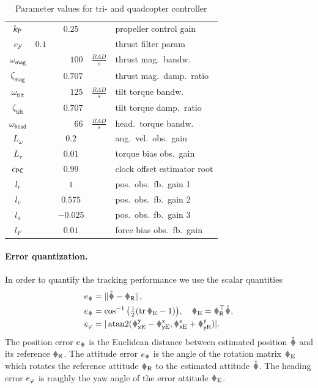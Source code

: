 \begin{table}
\begin{tabular}{crlrll}
  $k_{\mathsf{P}}$  & \multicolumn{4}{c}{$0.25$} & propeller control gain \\
  $c_F$ & $0.1$& & & & thrust filter param \\
  $\omega_{\mathsf{mag}}$ & & & $100$&$\tfrac{\unit{RAD}}{\unit{s}}$ & thrust mag.\ bandw.\ \\
  $\zeta_{\mathsf{mag}}$ & & & $0.707$& & thrust mag.\ damp.\ ratio \\
  $\omega_{\mathsf{tilt}}$ & & & $125$&$\tfrac{\unit{RAD}}{\unit{s}}$ & tilt torque bandw.\ \\
  $\zeta_{\mathsf{tilt}}$ & & & $0.707$& & tilt torque damp.\ ratio \\
  $\omega_{\mathsf{head}}$ & & & $66$&$\tfrac{\unit{RAD}}{\unit{s}}$ & head.\ torque bandw.\ \\
  \midrule
  $L_\omega$  & \multicolumn{4}{c}{$0.2$} & ang.\ vel.\ obs.\ gain \\
  $L_\tau$  & \multicolumn{4}{c}{$0.01$} & torque bias obs.\ gain \\
  $c_{\mathsf{PC}}$  & \multicolumn{4}{c}{$0.99$} & clock offset estimator root \\
  $l_r$  & \multicolumn{4}{c}{$1$} & pos.\ obs.\ fb.\ gain 1 \\
  $l_v$  & \multicolumn{4}{c}{$0.575$} & pos.\ obs.\ fb.\ gain 2 \\
  $l_a$  & \multicolumn{4}{c}{$-0.025$} & pos.\ obs.\ fb.\ gain 3 \\
  $l_F$  & \multicolumn{4}{c}{$0.01$} & force bias obs.\ fb.\ gain \\
  \bottomrule
 \end{tabular}
 \caption{Parameter values for tri- and quadcopter controller}
 \label{tab:ParamTriQuadCtrl}
\end{table}


\paragraph{Error quantization.}
In order to quantify the tracking performance we use the scalar quantities 
\begin{subequations}
\begin{align}
 e_{\r} &= \norm{\rObs - \rR},
\\
 e_{\R} &= \cos^{-1} \big( \tfrac{1}{2} (\tr\RE - 1) \big), \quad \RE = \RRT \RObs,
\\
 e_{\head} &= |\atanTwo(\REyx - \RExy, \RExx + \REyy)|.
\end{align} 
\end{subequations}
The position error $e_{\r}$ is the Euclidean distance between estimated position $\rObs$ and its reference $\rR$.
The attitude error $e_{\R}$ is the angle of the rotation matrix $\RE$ which rotates the reference attitude $\RR$ to the estimated attitude $\RObs$.
The heading error $e_{\varphi}$ is roughly the yaw angle of the error attitude $\RE$.

